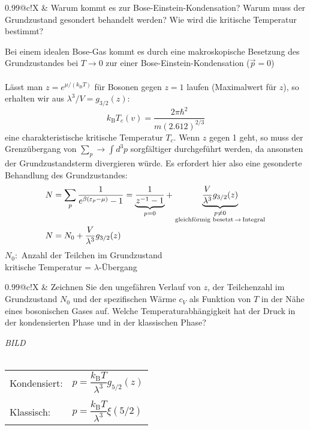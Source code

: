 \documentclass[a4paper,12pt]{scrartcl}
\makeatletter
\def\ab#1#2#3{\genfrac{}{}{0mm}{#1}{#2}{#3}}		%
\def\df#1#2{\dfrac{#1}{#2}}				%
\def\ke#1{\glq #1 \grq}					%
\def\kB{k_\mathrm{B}}					%
\newcounter{qc}\setcounter{qc}{1}
\newenvironment{fshaded}{
\def\FrameCommand{\fcolorbox{framecolor}{shadecolor}}
\MakeFramed {\FrameRestore}}
{\endMakeFramed}
\def\frage#1{
\begin{fshaded}
\noindent
\begin{tabularx}{0.99\textwidth}{@{}c!{\color{framecolor}\vline}X}
{ \bf \rm \theqc }	&	\noindent #1
\end{tabularx}
\stepcounter{qc}
\end{fshaded}
}
\makeatother
\begin{document}
\frage{Warum kommt es zur Bose-Einstein-Kondensation? Warum muss der Grundzustand gesondert behandelt werden? Wie wird die 
kritische Temperatur bestimmt?}
\noindent
Bei einem idealen Bose-Gas kommt es durch eine makroskopische Besetzung des Grundzustandes bei $T \rightarrow 0$ zur einer 
Bose-Einstein-Kondensation ($\vec{p}=0$)\\\\
Lässt man $z=e^{\mu / (\kB  T)}$ für Bosonen gegen $z=1$ laufen (Maximalwert für $z$), so erhalten wir aus 
${\lambda^3}/{V}=g_{3/2}(z)$:\\
\[ \kB  T_c(v)=\df{2 \pi \hbar^2}{m (2.612)^{2/3}} \]
eine charakteristische kritische Temperatur $T_c$. Wenn $z$ gegen 1 geht, so muss der Grenzübergang von $\sum_p \rightarrow 
\int d^3\! p$
sorgfältiger durchgeführt werden, da ansonsten der Grundzustandsterm divergieren würde. Es erfordert hier also eine gesonderte 
Behandlung des Grundzustandes:
\begin{align*}
N&=\sum_p \df{1}{e^{\beta (\varepsilon_p - \mu)}-1} = 
\underbrace{\df{1}{z^{-1}-1}}_{p=0}+\underbrace{\df{V}{\lambda^3}g_{3/2}(z)}_{\ab{1}{p \neq 0}{ \text{gleichförmig 
besetzt}\,\rightarrow\,\text{Integral}}}\\
N&=N_0+\df{V}{\lambda^3}g_{3/2}(z)\\
\end{align*}
$N_0:$ Anzahl der Teilchen im Grundzustand\\
kritische Temperatur = $\lambda$-Übergang



\frage{Zeichnen Sie den ungefähren Verlauf von $z$, der Teilchenzahl im Grundzustand $N_0$ und der spezifischen Wärme $c_V$ 
als Funktion von $T$ in der Nähe eines bosonischen Gases auf. Welche Temperaturabhängigkeit hat der Druck in der kondensierten 
Phase und in der \ke{klassischen} Phase?}
\noindent
\textit{BILD}\\\\
\begin{tabularx}{\textwidth}{@{}lX}
Kondensiert: & $p=\df{\kB  T}{\lambda^3}g_{5/2}(z)$\\\\
Klassisch: & $p=\df{\kB  T}{\lambda^3}\xi(5/2)$
\end{tabularx}

\end{document}
